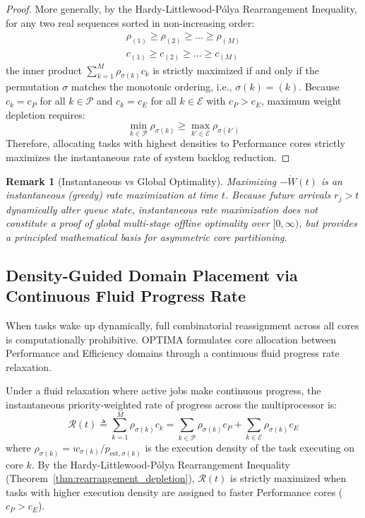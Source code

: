 \documentclass[conference]{IEEEtran}
\newtheorem{remark}{Remark}
\begin{document}
\begin{proof}
More generally, by the Hardy-Littlewood-P\'olya Rearrangement Inequality, for any two real sequences sorted in non-increasing order:
\begin{align}
\rho_{(1)} \ge \rho_{(2)} \ge \dots \ge \rho_{(M)} \\
c_{(1)} \ge c_{(2)} \ge \dots \ge c_{(M)}
\end{align}
the inner product $\sum_{k=1}^M \rho_{\sigma(k)} c_k$ is strictly maximized if and only if the permutation $\sigma$ matches the monotonic ordering, i.e., $\sigma(k) = (k)$.
Because $c_k = c_P$ for all $k \in \mathcal{P}$ and $c_k = c_E$ for all $k \in \mathcal{E}$ with $c_P > c_E$, maximum weight depletion requires:
\begin{equation}
\min_{k \in \mathcal{P}} \rho_{\sigma(k)} \ge \max_{k' \in \mathcal{E}} \rho_{\sigma(k')}
\end{equation}
Therefore, allocating tasks with highest densities to Performance cores strictly maximizes the instantaneous rate of system backlog reduction.
\end{proof}

\begin{remark}[Instantaneous vs Global Optimality]
Maximizing $-\dot{W}(t)$ is an instantaneous (greedy) rate maximization at time $t$. Because future arrivals $r_j > t$ dynamically alter queue state, instantaneous rate maximization does not constitute a proof of global multi-stage offline optimality over $[0, \infty)$, but provides a principled mathematical basis for asymmetric core partitioning.
\end{remark}

\subsection{Density-Guided Domain Placement via Continuous Fluid Progress Rate}
When tasks wake up dynamically, full combinatorial reassignment across all cores is computationally prohibitive. OPTIMA formulates core allocation between Performance and Efficiency domains through a continuous fluid progress rate relaxation.

Under a fluid relaxation where active jobs make continuous progress, the instantaneous priority-weighted rate of progress across the multiprocessor is:
\begin{equation}
\label{eq:fluid_progress_rate}
\mathcal{R}(t) \triangleq \sum_{k=1}^M \rho_{\sigma(k)} c_k = \sum_{k \in \mathcal{P}} \rho_{\sigma(k)} c_P + \sum_{k \in \mathcal{E}} \rho_{\sigma(k)} c_E
\end{equation}
where $\rho_{\sigma(k)} = w_{\sigma(k)} / p_{\mathrm{est},\sigma(k)}$ is the execution density of the task executing on core $k$. By the Hardy-Littlewood-P\'olya Rearrangement Inequality (Theorem~\ref{thm:rearrangement_depletion}), $\mathcal{R}(t)$ is strictly maximized when tasks with higher execution density are assigned to faster Performance cores ($c_P > c_E$).
\end{document}
